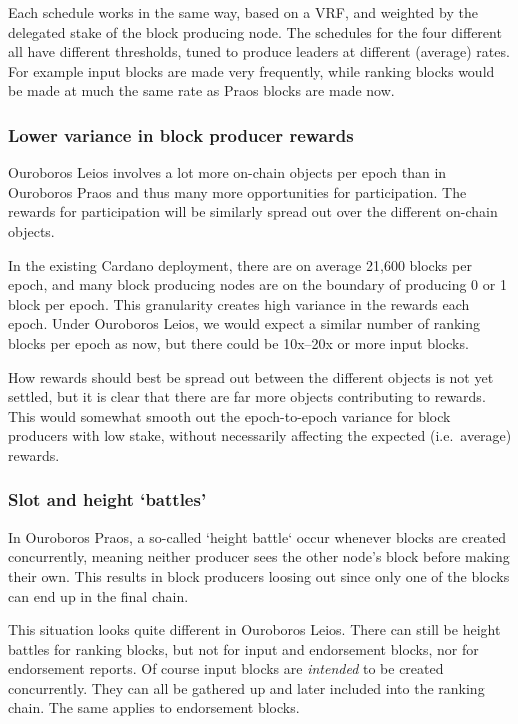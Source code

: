 \documentclass[11pt,a4paper]{article}
\begin{document}
Each schedule works in the same way, based on a VRF, and weighted by the
delegated stake of the block producing node. The schedules for the four
different all have different thresholds, tuned to produce leaders at different
(average) rates. For example input blocks are made very frequently, while
ranking blocks would be made at much the same rate as Praos blocks are made now.

\subsubsection{Lower variance in block producer rewards}
Ouroboros Leios involves a lot more on-chain objects per epoch than in
Ouroboros Praos and thus many more opportunities for participation. The rewards
for participation will be similarly spread out over the different on-chain
objects.

In the existing Cardano deployment, there are on average 21,600 blocks per
epoch, and many block producing nodes are on the boundary of producing 0 or 1
block per epoch. This granularity creates high variance in the rewards each
epoch. Under Ouroboros Leios, we would expect a similar number of ranking
blocks per epoch as now, but there could be 10x--20x or more input blocks.

How rewards should best be spread out between the different objects is not yet
settled, but it is clear that there are far more objects contributing to
rewards. This would somewhat smooth out the epoch-to-epoch variance for block
producers with low stake, without necessarily affecting the expected
(i.e.~average) rewards.

\subsubsection{Slot and height `battles'}
In Ouroboros Praos, a so-called `height battle` occur whenever blocks are
created concurrently, meaning neither producer sees the other node's block
before making their own. This results in block producers loosing out since only
one of the blocks can end up in the final chain.

This situation looks quite different in Ouroboros Leios. There can still be
height battles for ranking blocks, but not for input and endorsement blocks,
nor for endorsement reports. Of course input blocks are \emph{intended} to be
created concurrently. They can all be gathered up and later included into the
ranking chain. The same applies to endorsement blocks.
\end{document}
